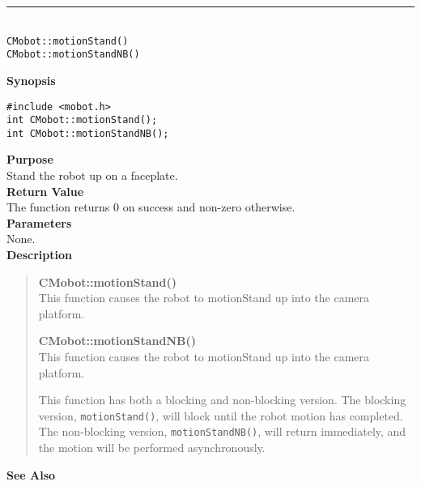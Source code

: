 \noindent
\vspace{5pt}
\rule{4.5in}{0.015in}\\
\noindent
{\LARGE \texttt{CMobot::motionStand()}}\\
{\LARGE \texttt{CMobot::motionStandNB()}}\\
{}

\noindent
{\bf Synopsis}
\vspace{-8pt}
\begin{verbatim}
#include <mobot.h>
int CMobot::motionStand();
int CMobot::motionStandNB();
\end{verbatim}

\noindent
{\bf Purpose}\\
Stand the robot up on a faceplate.\\

\noindent
{\bf Return Value}\\
The function returns 0 on success and non-zero otherwise.\\

\noindent
{\bf Parameters}\\
None.\\

\noindent
{\bf Description}\\
\vspace{-12pt}
\begin{quote}
{\bf CMobot::motionStand()}\\
This function causes the robot to motionStand up into the camera platform.

{\bf CMobot::motionStandNB()}\\
This function causes the robot to motionStand up into the camera platform.

This function has both a blocking and non-blocking version.
The blocking version, \texttt{motionStand()}, will block until the
robot motion has completed. The non-blocking version, \texttt{motionStandNB()},
will return immediately, and the motion will be performed asynchronously.\\
\end{quote}

\noindent
{\bf See Also}\\


